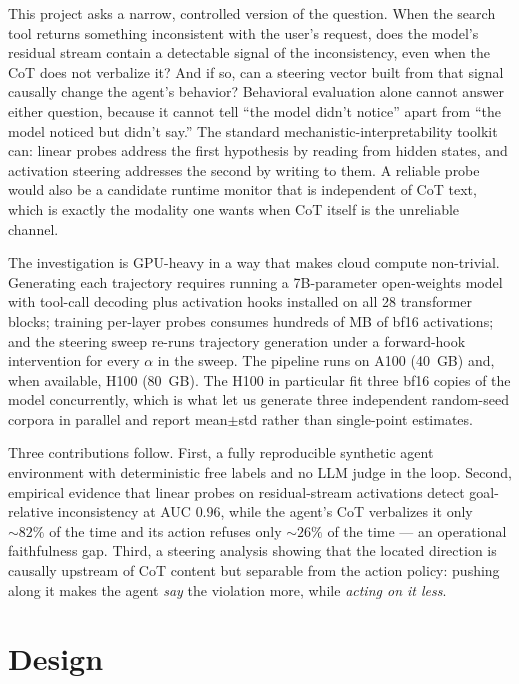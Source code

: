 \documentclass[11pt]{article}
\begin{document}
This project asks a narrow, controlled version of the question. When the
search tool returns something inconsistent with the user's request, does the
model's residual stream contain a detectable signal of the inconsistency,
even when the CoT does not verbalize it? And if so, can a steering vector
built from that signal causally change the agent's behavior? Behavioral
evaluation alone cannot answer either question, because it cannot tell ``the
model didn't notice'' apart from ``the model noticed but didn't say.'' The
standard mechanistic-interpretability toolkit can: linear probes
\citep{alain2016probes} address the first hypothesis by reading from hidden
states, and activation steering \citep{turner2023actadd, panickssery2024caa}
addresses the second by writing to them. A reliable probe would also be a
candidate runtime monitor that is independent of CoT text, which is exactly
the modality one wants when CoT itself is the unreliable channel.

The investigation is GPU-heavy in a way that makes cloud compute
non-trivial. Generating each trajectory requires running a 7B-parameter
open-weights model with tool-call decoding plus activation hooks installed
on all 28 transformer blocks; training per-layer probes consumes hundreds
of MB of bf16 activations; and the steering sweep re-runs trajectory
generation under a forward-hook intervention for every $\alpha$ in the
sweep. The pipeline runs on A100 (40~GB) and, when available, H100
(80~GB). The H100 in particular fit
three bf16 copies of the model concurrently, which is what let us generate
three independent random-seed corpora in parallel and report
mean$\pm$std rather than single-point estimates.

Three contributions follow. First, a fully reproducible synthetic agent
environment with deterministic free labels and no LLM judge in the loop.
Second, empirical evidence that linear probes on residual-stream activations
detect goal-relative inconsistency at AUC $0.96$, while the agent's CoT
verbalizes it only $\sim 82\%$ of the time and its action refuses only
$\sim 26\%$ of the time --- an operational faithfulness gap. Third, a
steering analysis showing that the located direction is causally upstream of
CoT content but separable from the action policy: pushing along it makes the
agent \emph{say} the violation more, while \emph{acting on it less}.

\section{Design}
\end{document}
